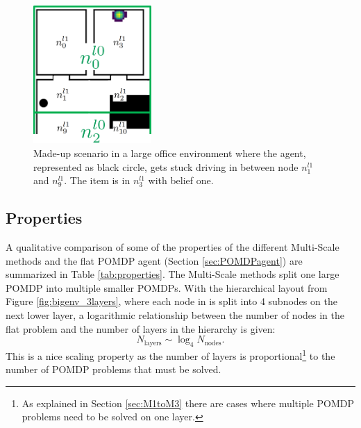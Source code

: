 \begin{figure}
    \centering
    \includegraphics[width=0.4\textwidth]{Report/images/stability_2.png}
    \caption{Made-up scenario in a large office environment where the agent, represented as black circle, gets stuck driving in between node $n_1^{l1}$ and $n_9^{l1}$. The item is in $n_3^{l1}$ with belief one.}
    \label{fig:stability}
\end{figure}

\subsection{Properties}\label{subsec:Multi-Scale_properties}
A qualitative comparison of some of the properties of the different Multi-Scale methods and the flat POMDP agent (Section \ref{sec:POMDPagent}) are summarized in Table \ref{tab:properties}.  The Multi-Scale methods split one large POMDP into multiple smaller POMDPs. With the hierarchical layout from Figure \ref{fig:bigenv_3layers}, where each node in is split into 4 subnodes on the next lower layer, a logarithmic relationship between the number of nodes in the flat problem and the number of layers in the hierarchy is given:
\begin{equation}
    N_\text{layers} \sim \log_4 N_\text{nodes}.
\end{equation}
This is a nice scaling property as the number of layers is proportional\footnote{As explained in Section \ref{sec:M1toM3} there are cases where multiple POMDP problems need to be solved on one layer.} to the number of POMDP problems that must be solved. \\

